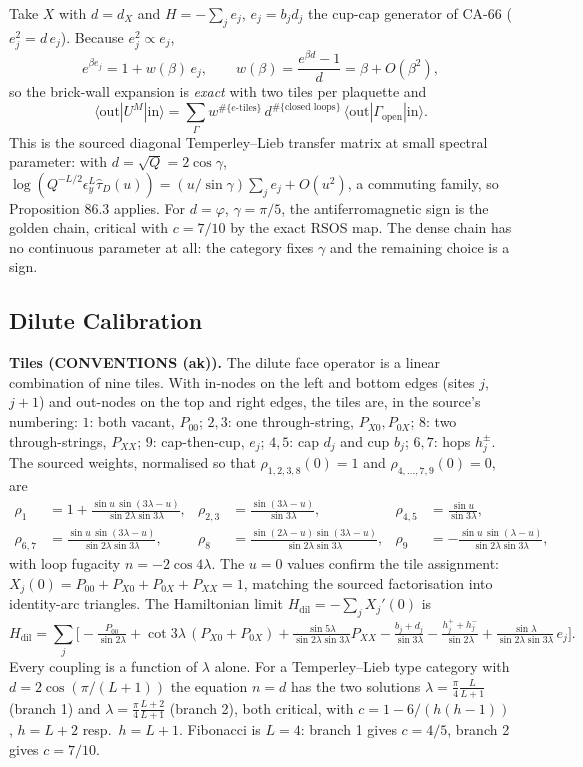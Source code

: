 Take \(X\) with \(d=d_X\) and \(H=-\sum_j e_j\), \(e_j=b_jd_j\) the cup-cap
generator of CA-66 (\(e_j^2=d\,e_j\)).  Because \(e_j^2\propto e_j\),
\[
  e^{\beta e_j}=1+w(\beta)\,e_j,\qquad w(\beta)=\frac{e^{\beta d}-1}{d}=\beta+O(\beta^2),
\]
so the brick-wall expansion is \emph{exact} with two tiles per plaquette and
\[
  \langle\mathrm{out}|U^{M}|\mathrm{in}\rangle
  =\sum_{\Gamma}w^{\#\{e\text{-tiles}\}}\,d^{\#\{\text{closed loops}\}}\,
  \langle\mathrm{out}|\Gamma_{\mathrm{open}}|\mathrm{in}\rangle .
\]
This is the sourced diagonal Temperley--Lieb transfer matrix at small
spectral parameter: with \(d=\sqrt{Q}=2\cos\gamma\),
\(\log(Q^{-L/2}\epsilon_y^L\hat\tau_D(u))=(u/\sin\gamma)\sum_je_j+O(u^2)\),
a commuting family, so Proposition 86.3 applies.  For
\(d=\varphi\), \(\gamma=\pi/5\), the antiferromagnetic sign is the golden
chain, critical with \(c=7/10\) by the exact RSOS map.  The dense chain has
no continuous parameter at all: the category fixes \(\gamma\) and the
remaining choice is a sign.

\subsection{Dilute Calibration}

\textbf{Tiles (CONVENTIONS (ak)).}  The dilute face operator is a linear
combination of nine tiles.  With in-nodes on the left and bottom edges
(sites \(j\), \(j+1\)) and out-nodes on the top and right edges, the tiles
are, in the source's numbering:
\(1\): both vacant, \(P_{00}\);
\(2,3\): one through-string, \(P_{X0},P_{0X}\);
\(8\): two through-strings, \(P_{XX}\);
\(9\): cap-then-cup, \(e_j\);
\(4,5\): cap \(d_j\) and cup \(b_j\);
\(6,7\): hops \(h_j^{\pm}\).
The sourced weights, normalised so that \(\rho_{1,2,3,8}(0)=1\) and
\(\rho_{4,\dots,7,9}(0)=0\), are
\[
\begin{aligned}
\rho_1&=1+\tfrac{\sin u\,\sin(3\lambda-u)}{\sin2\lambda\sin3\lambda},&
\rho_{2,3}&=\tfrac{\sin(3\lambda-u)}{\sin3\lambda},&
\rho_{4,5}&=\tfrac{\sin u}{\sin3\lambda},\\
\rho_{6,7}&=\tfrac{\sin u\,\sin(3\lambda-u)}{\sin2\lambda\sin3\lambda},&
\rho_8&=\tfrac{\sin(2\lambda-u)\sin(3\lambda-u)}{\sin2\lambda\sin3\lambda},&
\rho_9&=-\tfrac{\sin u\,\sin(\lambda-u)}{\sin2\lambda\sin3\lambda},
\end{aligned}
\]
with loop fugacity \(n=-2\cos4\lambda\).  The \(u=0\) values confirm the
tile assignment: \(X_j(0)=P_{00}+P_{X0}+P_{0X}+P_{XX}=1\), matching the
sourced factorisation into identity-arc triangles.  The Hamiltonian limit
\(H_{\mathrm{dil}}=-\sum_jX_j'(0)\) is
\[
  H_{\mathrm{dil}}=\sum_j\Big[
  -\tfrac{P_{00}}{\sin2\lambda}
  +\cot3\lambda\,(P_{X0}+P_{0X})
  +\tfrac{\sin5\lambda}{\sin2\lambda\sin3\lambda}P_{XX}
  -\tfrac{b_j+d_j}{\sin3\lambda}
  -\tfrac{h_j^++h_j^-}{\sin2\lambda}
  +\tfrac{\sin\lambda}{\sin2\lambda\sin3\lambda}\,e_j\Big].
\]
Every coupling is a function of \(\lambda\) alone.  For a Temperley--Lieb
type category with \(d=2\cos(\pi/(L+1))\) the equation \(n=d\) has the two
solutions \(\lambda=\tfrac{\pi}{4}\tfrac{L}{L+1}\) (branch 1) and
\(\lambda=\tfrac{\pi}{4}\tfrac{L+2}{L+1}\) (branch 2), both critical, with
\(c=1-6/(h(h-1))\), \(h=L+2\) resp.\ \(h=L+1\).  Fibonacci is \(L=4\):
branch 1 gives \(c=4/5\), branch 2 gives \(c=7/10\).

